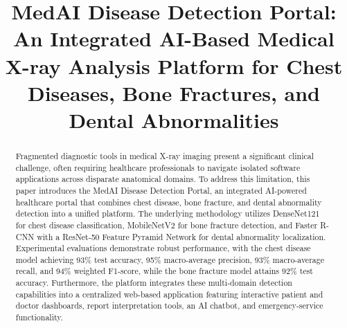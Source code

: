 \documentclass[conference]{IEEEtran}
\begin{document}
\title{MedAI Disease Detection Portal: An Integrated AI-Based Medical X-ray Analysis Platform for Chest Diseases, Bone Fractures, and Dental Abnormalities}

\author{ \and {} \and {} \and {}}

\maketitle

\begin{abstract}
Fragmented diagnostic tools in medical X-ray imaging present a significant clinical challenge, often requiring healthcare professionals to navigate isolated software applications across disparate anatomical domains. To address this limitation, this paper introduces the MedAI Disease Detection Portal, an integrated AI-powered healthcare portal that combines chest disease, bone fracture, and dental abnormality detection into a unified platform. The underlying methodology utilizes DenseNet121 for chest disease classification, MobileNetV2 for bone fracture detection, and Faster R-CNN with a ResNet-50 Feature Pyramid Network for dental abnormality localization. Experimental evaluations demonstrate robust performance, with the chest disease model achieving 93\% test accuracy, 95\% macro-average precision, 93\% macro-average recall, and 94\% weighted F1-score, while the bone fracture model attains 92\% test accuracy. Furthermore, the platform integrates these multi-domain detection capabilities into a centralized web-based application featuring interactive patient and doctor dashboards, report interpretation tools, an AI chatbot, and emergency-service functionality.
\end{abstract}
\end{document}

